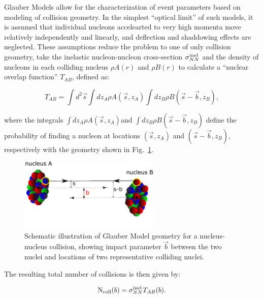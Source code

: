 Glauber Models allow for the characterization of event parameters based on modeling of collision geometry.  In the simplest ``optical limit'' of such models, it is assumed that individual nucleons accelearted to very high momenta move relatively independently and linearly, and deflection and shaddowing effects are neglected.  These assumptions reduce the problem to one of only collision geometry, take the inelastic nucleon-nucleon cross-section $\sigma_{NN}^{\rm inel}$ and the density of nucleons in each colliding nucleus $\rho{A}(r)$ and $\rho{B}(r)$ to calculate a ``nuclear overlap function'' $T_{AB}$, defined as: 

\begin{equation}
\label{eq:t_aa}
T_{AB} = \int d^{2}\vec{s} \int dz_{A} \rho{A}(\vec{s}, z_{A}) \int dz_{B} \rho{B}(\vec{s} - \vec{b}, z_{B}),
\end{equation}

\noindent where the integrals  $\int dz_{A} \rho{A}(\vec{s}, z_{A}) $and  $\int dz_{B} \rho{B}(\vec{s} - \vec{b}, z_{B})$ define the probability of finding a nucleon at locations $(\vec{s}, z_{A})$ and $(\vec{s} - \vec{b}, z_{B})$, respectively with the geometry shown in Fig.~\ref{fig:illustration_glauber}.  

\begin{figure}[hbtp]
\begin{center}
\includegraphics[width=0.6\textwidth]{illustrations/glauber.pdf}
\caption[Glauber model illustration]{Schematic illustration of Glauber Model geometry for a nucleus-nucleus collision, showing impact parameter $\vec{b}$ between the two nuclei and locations of two representative colliding nuclei.}
\label{fig:illustration_glauber}
\end{center}
\end{figure}

\noindent The resulting total number of collisions is then given by: 

\begin{equation}
\label{eq:n_coll}
{\rm N_{coll}}(b) = \sigma_{NN}^{\rm inel} T_{AB}(b).
\end{equation}

